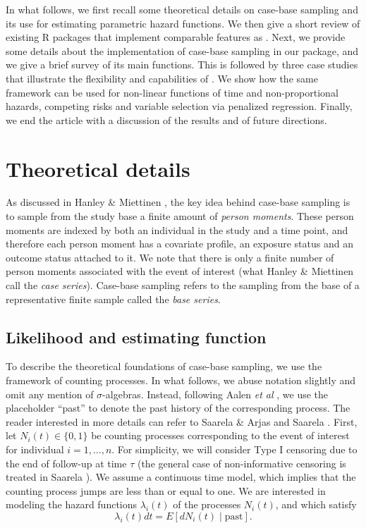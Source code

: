 In what follows, we first recall some theoretical details on case-base
sampling and its use for estimating parametric hazard functions. We then
give a short review of existing R packages that implement comparable
features as . Next, we provide some details about the
implementation of case-base sampling in our package, and we give a brief
survey of its main functions. This is followed by three case studies
that illustrate the flexibility and capabilities of . We
show how the same framework can be used for non-linear functions of time
and non-proportional hazards, competing risks and variable selection via
penalized regression. Finally, we end the article with a discussion of
the results and of future directions.

\hypertarget{theory}{%
\section{Theoretical details}\label{theory}}

As discussed in Hanley \& Miettinen \citeyearpar{hanley2009fitting}, the
key idea behind case-base sampling is to sample from the study base a
finite amount of \emph{person moments}. These person moments are indexed
by both an individual in the study and a time point, and therefore each
person moment has a covariate profile, an exposure status and an outcome
status attached to it. We note that there is only a finite number of
person moments associated with the event of interest (what Hanley \&
Miettinen call the \emph{case series}). Case-base sampling refers to the
sampling from the base of a representative finite sample called the
\emph{base series}.

\hypertarget{likelihood-and-estimating-function}{%
\subsection{Likelihood and estimating
function}\label{likelihood-and-estimating-function}}

To describe the theoretical foundations of case-base sampling, we use
the framework of counting processes. In what follows, we abuse notation
slightly and omit any mention of \(\sigma\)-algebras. Instead, following
Aalen \textit{et al} \citeyearpar{aalen2008survival}, we use the
placeholder ``past'' to denote the past history of the corresponding
process. The reader interested in more details can refer to Saarela \&
Arjas \citeyearpar{saarela2015non} and Saarela
\citeyearpar{saarela2016case}. First, let \(N_{i}(t) \in \{0, 1\}\) be
counting processes corresponding to the event of interest for individual
\(i=1, \ldots,n\). For simplicity, we will consider Type I censoring due
to the end of follow-up at time \(\tau\) (the general case of
non-informative censoring is treated in Saarela
\citeyearpar{saarela2016case}). We assume a continuous time model, which
implies that the counting process jumps are less than or equal to one.
We are interested in modeling the hazard functions \(\lambda_{i}(t)\) of
the processes \(N_i(t)\), and which satisfy
\[\lambda_{i}(t) dt = E[dN_{i}(t)\mid \mathrm{past}].\]

